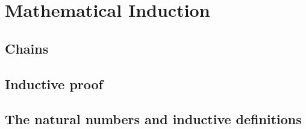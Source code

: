 \chapter{Mathematical Induction}
\section{Chains}
\section{Inductive proof}
\section{The natural numbers and inductive definitions}

